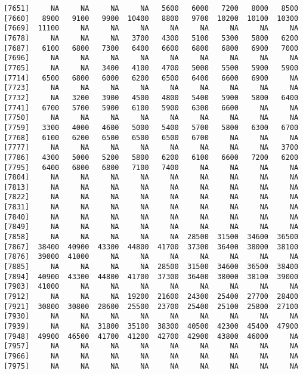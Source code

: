 \documentclass[]{article}
\begin{document}
\begin{verbatim}
 [7651]     NA     NA     NA     NA   5600   6000   7200   8000   8500
 [7660]   8900   9100   9900  10400   8800   9700  10200  10100  10300
 [7669]  11100     NA     NA     NA     NA     NA     NA     NA     NA
 [7678]     NA     NA     NA   3700   4300   5100   5300   5800   6200
 [7687]   6100   6800   7300   6400   6600   6800   6800   6900   7000
 [7696]     NA     NA     NA     NA     NA     NA     NA     NA     NA
 [7705]     NA     NA   3400   4100   4700   5000   5500   5900   5900
 [7714]   6500   6800   6000   6200   6500   6400   6600   6900     NA
 [7723]     NA     NA     NA     NA     NA     NA     NA     NA     NA
 [7732]     NA   3200   3900   4500   4800   5400   5900   5800   6400
 [7741]   6700   5700   5900   6100   5900   6300   6600     NA     NA
 [7750]     NA     NA     NA     NA     NA     NA     NA     NA     NA
 [7759]   3300   4000   4600   5000   5400   5700   5800   6300   6700
 [7768]   6100   6200   6500   6500   6500   6700     NA     NA     NA
 [7777]     NA     NA     NA     NA     NA     NA     NA     NA   3700
 [7786]   4300   5000   5200   5800   6200   6100   6600   7200   6200
 [7795]   6400   6800   6800   7100   7400     NA     NA     NA     NA
 [7804]     NA     NA     NA     NA     NA     NA     NA     NA     NA
 [7813]     NA     NA     NA     NA     NA     NA     NA     NA     NA
 [7822]     NA     NA     NA     NA     NA     NA     NA     NA     NA
 [7831]     NA     NA     NA     NA     NA     NA     NA     NA     NA
 [7840]     NA     NA     NA     NA     NA     NA     NA     NA     NA
 [7849]     NA     NA     NA     NA     NA     NA     NA     NA     NA
 [7858]     NA     NA     NA     NA     NA  28500  31500  34600  36500
 [7867]  38400  40900  43300  44800  41700  37300  36400  38000  38100
 [7876]  39000  41000     NA     NA     NA     NA     NA     NA     NA
 [7885]     NA     NA     NA     NA  28500  31500  34600  36500  38400
 [7894]  40900  43300  44800  41700  37300  36400  38000  38100  39000
 [7903]  41000     NA     NA     NA     NA     NA     NA     NA     NA
 [7912]     NA     NA     NA  19200  21600  24300  25400  27700  28400
 [7921]  30800  30800  28600  25500  23700  25400  25100  25800  27100
 [7930]     NA     NA     NA     NA     NA     NA     NA     NA     NA
 [7939]     NA     NA  31800  35100  38300  40500  42300  45400  47900
 [7948]  49900  46500  41700  41200  42700  42900  43800  46000     NA
 [7957]     NA     NA     NA     NA     NA     NA     NA     NA     NA
 [7966]     NA     NA     NA     NA     NA     NA     NA     NA     NA
 [7975]     NA     NA     NA     NA     NA     NA     NA     NA     NA

\end{verbatim}
\end{document}
